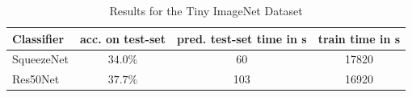 \documentclass[11pt]{article}
\begin{document}
\begin{table}
	\centering
	\begin{tabular}{l|c|c|c}
	\toprule
		Classifier & acc. on test-set & pred. test-set time in s & train time in s\\
	\midrule
		SqueezeNet 		  & $34.0\%$           & 60 						 & 17820\\
		Res50Net   		  & $37.7\%$           & 103 					     & 16920\\
	\bottomrule
	\end{tabular}
	\caption{Results for the Tiny ImageNet Dataset}
\label{conc::2}
\end{table}


\newpage


\end{document}
